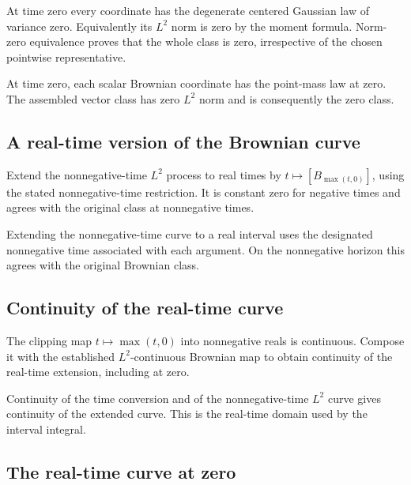\documentclass[11pt,a4paper]{report}
\begin{document}
At time zero every coordinate has the degenerate centered Gaussian law of variance zero. Equivalently its \(L^2\) norm is zero by the moment formula. Norm-zero equivalence proves that the whole class is zero, irrespective of the chosen pointwise representative.



At time zero, each scalar Brownian coordinate has the point-mass law at zero. The assembled vector class has zero \(L^2\) norm and is consequently the zero class.

\subsection{\texorpdfstring{A real-time version of the Brownian curve}{A real-time version of the Brownian curve}}
\label{report-step-UnadjustedLangevin-GaussianCoordinates-lean-21}


Extend the nonnegative-time \(L^2\) process to real times by \(t\mapsto[B_{\max(t,0)}]\), using the stated nonnegative-time restriction. It is constant zero for negative times and agrees with the original class at nonnegative times.



Extending the nonnegative-time curve to a real interval uses the designated nonnegative time associated with each argument. On the nonnegative horizon this agrees with the original Brownian class.

\subsection{\texorpdfstring{Continuity of the real-time curve}{Continuity of the real-time curve}}
\label{report-step-UnadjustedLangevin-GaussianCoordinates-lean-22}


The clipping map \(t\mapsto\max(t,0)\) into nonnegative reals is continuous. Compose it with the established \(L^2\)-continuous Brownian map to obtain continuity of the real-time extension, including at zero.



Continuity of the time conversion and of the nonnegative-time \(L^2\) curve gives continuity of the extended curve. This is the real-time domain used by the interval integral.

\subsection{\texorpdfstring{The real-time curve at zero}{The real-time curve at zero}}
\label{report-step-UnadjustedLangevin-GaussianCoordinates-lean-23}
\end{document}
